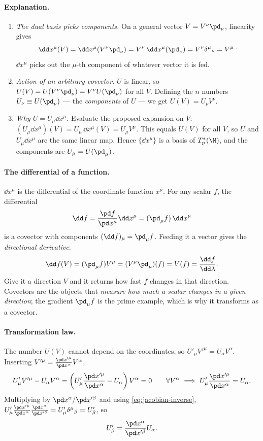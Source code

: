 \paragraph{Explanation.}
\begin{enumerate}
  \item \emph{The dual basis picks components.} On a general vector $V=V^\nu\pd_\nu$, linearity gives
  \[
    \dd x^\mu(V)=\dd x^\mu(V^\nu\pd_\nu)=V^\nu\,\dd x^\mu(\pd_\nu)=V^\nu\delta^\mu{}_\nu=V^\mu :
  \]
  $\dd x^\mu$ picks out the $\mu$-th component of whatever vector it is fed.
  \item \emph{Action of an arbitrary covector.} $U$ is linear, so $U(V)=U(V^\nu\pd_\nu)=V^\nu U(\pd_\nu)$ for all $V$. Defining the $n$ numbers $U_\nu\equiv U(\pd_\nu)$ --- the \emph{components} of $U$ --- we get $U(V)=U_\nu V^\nu$.
  \item \emph{Why $U=U_\mu\dd x^\mu$.} Evaluate the proposed expansion on $V$: $(U_\mu\dd x^\mu)(V)=U_\mu\,\dd x^\mu(V)=U_\mu V^\mu$. This equals $U(V)$ for all $V$, so $U$ and $U_\mu\dd x^\mu$ are the same linear map. Hence $\{\dd x^\mu\}$ is a basis of $T_p^*(\M)$, and the components are $U_\mu=U(\pd_\mu)$.
\end{enumerate}

\paragraph{The differential of a function.} $\dd x^\mu$ is the differential of the coordinate function $x^\mu$. For any scalar $f$, the differential
\begin{equation}
  \dd f=\frac{\pd f}{\pd x^\mu}\dd x^\mu=(\pd_\mu f)\,\dd x^\mu
\end{equation}
is a covector with components $(\dd f)_\mu=\pd_\mu f$. Feeding it a vector gives the \emph{directional derivative}:
\begin{equation}
  \dd f(V)=(\pd_\mu f)V^\mu=(V^\mu\pd_\mu)(f)=V(f)=\frac{\dd f}{\dd\lambda}.
\end{equation}
Give it a direction $V$ and it returns how fast $f$ changes in that direction. Covectors are the objects that \emph{measure how much a scalar changes in a given direction}; the gradient $\pd_\mu f$ is the prime example, which is why it transforms as a covector.

\paragraph{Transformation law.} The number $U(V)$ cannot depend on the coordinates, so $U'_\mu V'^\mu=U_\alpha V^\alpha$. Inserting $V'^\mu=\frac{\pd x'^\mu}{\pd x^\alpha}V^\alpha$,
\[
  U'_\mu V'^\mu-U_\alpha V^\alpha=\left(U'_\mu\frac{\pd x'^\mu}{\pd x^\alpha}-U_\alpha\right)V^\alpha=0\qquad\forall V^\alpha
  \ \Longrightarrow\ U'_\mu\frac{\pd x'^\mu}{\pd x^\alpha}=U_\alpha .
\]
Multiplying by $\pd x^\alpha/\pd x'^\beta$ and using \eqref{eq:jacobian-inverse}, $U'_\mu\frac{\pd x'^\mu}{\pd x^\alpha}\frac{\pd x^\alpha}{\pd x'^\beta}=U'_\mu\delta^\mu{}_\beta=U'_\beta$, so
\begin{equation}
  U'_\beta=\frac{\pd x^\alpha}{\pd x'^\beta}U_\alpha .
\end{equation}

